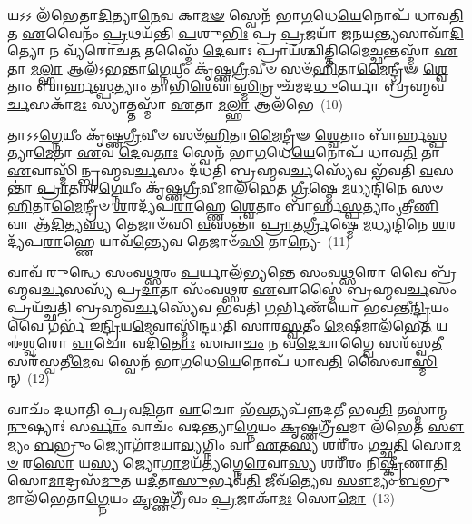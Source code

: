 𑌯𑌽𑌽 𑌲᳴𑌭𑍇𑌤𑌾\-\ul{𑌦𑌿}\-𑌤𑍍𑌯𑌾\-\ul{𑌨𑍇}\-𑌵 𑌕𑌾\-\ul{𑌮}\-\-\ul{𑍟} 𑌸𑍍𑌵𑍇𑌨᳴ 𑌭𑌾\-\ul{𑌗}\-𑌧𑍇\-\ul{𑌯𑍇}\-𑌨𑍋𑌪᳴ 𑌧𑌾𑌵\-\ul{𑌤𑌿} 𑌤 \ul{𑌏}\-𑌵𑍈𑌨𑌂᳴ \ul{𑌪𑍍𑌰}\-𑌥𑌯᳴𑌨𑍍𑌤𑌿 \ul{𑌪}\-𑌶𑍁\-\ul{𑌭𑌿𑌃} 𑌪𑍍𑌰 \ul{𑌪𑍍𑌰}\-𑌜𑌯𑌾᳴ 𑌜𑌨𑌯\-\ul{𑌨𑍍𑌤𑍍𑌯}\-𑌸𑌾𑌵𑌾᳴\-\ul{𑌦𑌿}\-𑌤𑍍𑌯𑍋 𑌨 𑌵𑍍𑌯᳴𑌰𑍋𑌚\-\ul{𑌤} 𑌤𑌸𑍍𑌮𑍈᳴ \ul{𑌦𑍇}\-𑌵𑌾𑌃 𑌪𑍍𑌰𑌾𑌯᳴𑌶𑍍𑌚𑌿𑌤𑍍𑌤𑌿𑌮𑍈\-\ul{𑌚𑍍𑌛}\-𑌨𑍍𑌤𑌸𑍍𑌮𑌾᳴ \ul{𑌏}\-𑌤𑌾 \ul{𑌮}\-\-\ul{𑌲𑍍}\-\mbox{}𑌹𑌾 𑌆𑌲᳴\-𑌽𑌭𑌨𑍍𑌤𑌾\-\ul{𑌗𑍍𑌨𑍇}\-𑌯𑍀𑌂 𑌕𑍃᳴𑌷𑍍𑌣\-\ul{𑌗𑍍𑌰𑍀}\-𑌵𑍀𑍞 𑌸𑍞᳴\-\ul{𑌹𑌿}\-𑌤𑌾\-\ul{𑌮𑍈}\-𑌨𑍍𑌦𑍍𑌰𑍀𑍟 \ul{𑌶𑍍𑌵𑍇}\-𑌤𑌾𑌂 𑌬𑌾᳴𑌰𑍍\mbox{}𑌹\-\ul{𑌸𑍍𑌪}\-𑌤𑍍𑌯𑌾𑌂 𑌤𑌾𑌭𑌿᳴\-\ul{𑌰𑍇}\-𑌵𑌾\-\ul{𑌸𑍍𑌮𑌿}\-𑌨𑍍𑌰𑍁𑌚᳴𑌮𑌦\-\ul{𑌧𑍁}\-𑌰𑍍𑌯𑍋 𑌬𑍍𑌰᳴𑌹𑍍𑌮𑌵\-\ul{𑌰𑍍𑌚}\-𑌸𑌕𑌾᳴\-\ul{𑌮𑌃} 𑌸𑍍𑌯𑌾𑌤𑍍𑌤𑌸𑍍𑌮𑌾᳴ \ul{𑌏}\-𑌤𑌾 \ul{𑌮}\-\-\ul{𑌲𑍍}\-\mbox{}𑌹𑌾 𑌆𑌲᳴𑌭𑍇\-~(10)

𑌤𑌾𑌽𑌽\-\ul{𑌗𑍍𑌨𑍇}\-𑌯𑍀𑌂 𑌕𑍃᳴𑌷𑍍𑌣\-\ul{𑌗𑍍𑌰𑍀}\-𑌵𑍀𑍞 𑌸𑍞᳴\-\ul{𑌹𑌿}\-𑌤𑌾\-\ul{𑌮𑍈}\-𑌨𑍍𑌦𑍍𑌰𑍀𑍟 \ul{𑌶𑍍𑌵𑍇}\-𑌤𑌾𑌂 𑌬𑌾᳴𑌰𑍍\mbox{}𑌹\-\ul{𑌸𑍍𑌪}\-𑌤𑍍𑌯𑌾\-\ul{𑌮𑍇}\-𑌤𑌾 \ul{𑌏}\-𑌵 \ul{𑌦𑍇}\-𑌵\-\ul{𑌤𑌾𑌃} 𑌸𑍍𑌵𑍇𑌨᳴ 𑌭𑌾\-\ul{𑌗}\-𑌧𑍇\-\ul{𑌯𑍇}\-𑌨𑍋𑌪᳴ 𑌧𑌾𑌵\-\ul{𑌤𑌿} 𑌤𑌾 \ul{𑌏}\-𑌵𑌾𑌸𑍍𑌮𑌿᳴𑌨𑍍𑌬𑍍𑌰𑌹𑍍𑌮𑌵\-\ul{𑌰𑍍𑌚}\-𑌸𑌂 𑌦᳴𑌧𑌤𑌿 𑌬𑍍𑌰𑌹𑍍𑌮𑌵\-\ul{𑌰𑍍𑌚}\-𑌸𑍍𑌯𑍇᳴𑌵 𑌭᳴𑌵𑌤𑌿 \ul{𑌵}\-𑌸𑌨𑍍𑌤𑌾॑ \ul{𑌪𑍍𑌰𑌾}\-𑌤𑌰𑌾॑\-\ul{𑌗𑍍𑌨𑍇}\-𑌯𑍀𑌂 𑌕𑍃᳴𑌷𑍍𑌣\-\ul{𑌗𑍍𑌰𑍀}\-𑌵𑍀𑌮𑌾𑌲᳴𑌭𑍇𑌤 \ul{𑌗𑍍𑌰𑍀}\-𑌷𑍍𑌮𑍇 \ul{𑌮}\-𑌧𑍍𑌯𑌨𑍍𑌦𑌿᳴𑌨𑍇 𑌸𑍞\-\ul{𑌹𑌿}\-𑌤𑌾\-\ul{𑌮𑍈}\-𑌨𑍍𑌦𑍍𑌰𑍀𑍞 \ul{𑌶}\-𑌰𑌦𑍍𑌯᳴𑌪\-\ul{𑌰𑌾}\-𑌹𑍍𑌣𑍇 \ul{𑌶𑍍𑌵𑍇}\-𑌤𑌾𑌂 𑌬𑌾᳴𑌰𑍍\mbox{}𑌹\-\ul{𑌸𑍍𑌪}\-𑌤𑍍𑌯𑌾𑌂 𑌤𑍍𑌰𑍀\-\ul{𑌣𑌿} 𑌵𑌾 𑌆᳴\-\ul{𑌦𑌿}\-𑌤𑍍𑌯\-\ul{𑌸𑍍𑌯} 𑌤𑍇𑌜𑌾𑍞᳴𑌸𑌿 \ul{𑌵}\-𑌸𑌨𑍍𑌤𑌾॑ \ul{𑌪𑍍𑌰𑌾}\-𑌤\-\ul{𑌰𑍍𑌗𑍍𑌰𑍀}\-𑌷𑍍𑌮𑍇 \ul{𑌮}\-𑌧𑍍𑌯𑌨𑍍𑌦𑌿᳴𑌨𑍇 \ul{𑌶}\-𑌰𑌦𑍍𑌯᳴𑌪\-\ul{𑌰𑌾}\-𑌹𑍍𑌣𑍇 𑌯𑌾𑌵᳴\-\ul{𑌨𑍍𑌤𑍍𑌯𑍇}\-𑌵 𑌤𑍇𑌜𑌾𑍞᳴\-\ul{𑌸𑌿} 𑌤𑌾\-\ul{𑌨𑍍𑌯𑍇}\--~(11)

𑌵𑌾𑌵᳴ 𑌰𑍁𑌨𑍍𑌧𑍇 𑌸𑌂𑌵\-\ul{𑌥𑍍𑌸}\-𑌰𑌂 \ul{𑌪}\-𑌰𑍍𑌯𑌾𑌲᳴𑌭𑍍𑌯𑌨𑍍𑌤𑍇 𑌸𑌂𑌵\-\ul{𑌥𑍍𑌸}\-𑌰𑍋 𑌵𑍈 𑌬𑍍𑌰᳴𑌹𑍍𑌮𑌵\-\ul{𑌰𑍍𑌚}\-𑌸𑌸𑍍𑌯᳴ 𑌪𑍍𑌰\-\ul{𑌦𑌾}\-𑌤𑌾 𑌸𑌂᳴𑌵\-\ul{𑌥𑍍𑌸}\-𑌰 \ul{𑌏}\-𑌵𑌾𑌸𑍍𑌮𑍈॑ 𑌬𑍍𑌰𑌹𑍍𑌮𑌵\-\ul{𑌰𑍍𑌚}\-𑌸𑌂 𑌪𑍍𑌰𑌯᳴𑌚𑍍𑌛𑌤𑌿 𑌬𑍍𑌰𑌹𑍍𑌮𑌵\-\ul{𑌰𑍍𑌚}\-𑌸𑍍𑌯𑍇᳴𑌵 𑌭᳴𑌵𑌤𑌿 \ul{𑌗}\-𑌰𑍍𑌭𑌿𑌣᳴𑌯𑍋 𑌭𑌵𑌨𑍍𑌤𑍀\-\ul{𑌨𑍍𑌦𑍍𑌰𑌿}\-𑌯𑌂 𑌵𑍈 𑌗𑌰𑍍𑌭᳴ 𑌇\-\ul{𑌨𑍍𑌦𑍍𑌰𑌿}\-𑌯\-\ul{𑌮𑍇}\-𑌵𑌾𑌸𑍍𑌮𑌿᳴𑌨𑍍𑌦𑌧𑌤𑌿 𑌸𑌾𑌰\-\ul{𑌸𑍍𑌵}\-𑌤𑍀𑌂 \ul{𑌮𑍇}\-𑌷𑍀𑌮𑌾\-𑌲᳴𑌭𑍇\-\ul{𑌤} 𑌯 𑌈॑\-\ul{𑌶𑍍𑌵}\-𑌰𑍋 \ul{𑌵𑌾}\-𑌚𑍋 𑌵𑌦𑌿᳴\-\ul{𑌤𑍋𑌃} 𑌸𑌨𑍍𑌵𑌾\-\ul{𑌚𑌂} 𑌨 𑌵\-\ul{𑌦𑍇}\-𑌦𑍍𑌵𑌾𑌗𑍍𑌵𑍈 𑌸𑌰᳴𑌸𑍍𑌵\-\ul{𑌤𑍀} 𑌸𑌰᳴𑌸𑍍𑌵𑌤𑍀\-\ul{𑌮𑍇}\-𑌵 𑌸𑍍𑌵𑍇𑌨᳴ 𑌭𑌾\-\ul{𑌗}\-𑌧𑍇\-\ul{𑌯𑍇}\-𑌨𑍋𑌪᳴ 𑌧𑌾𑌵\-\ul{𑌤𑌿} 𑌸𑍈𑌵𑌾\-\ul{𑌸𑍍𑌮𑌿}\-𑌨𑍍~(12)

𑌵𑌾𑌚𑌂᳴ 𑌦𑌧𑌾𑌤𑌿 𑌪𑍍𑌰𑌵\-\ul{𑌦𑌿}\-𑌤𑌾 \ul{𑌵𑌾}\-𑌚𑍋 𑌭᳴\-\ul{𑌵}\-𑌤𑍍𑌯𑌪᳴𑌨𑍍𑌨𑌦𑌤𑍀 𑌭𑌵\-\ul{𑌤𑌿} 𑌤𑌸𑍍𑌮𑌾॑𑌨𑍍𑌮\-\ul{𑌨𑍁}\-𑌷𑍍𑌯𑌾𑌃॑ 𑌸\-\ul{𑌰𑍍𑌵𑌾𑌂} 𑌵𑌾𑌚𑌂᳴ 𑌵𑌦𑌨𑍍𑌤𑍍𑌯𑌾\-\ul{𑌗𑍍𑌨𑍇}\-𑌯𑌂 \ul{𑌕𑍃}\-𑌷𑍍𑌣𑌗𑍍𑌰𑍀᳴\-\ul{𑌵}\-𑌮𑌾 𑌲᳴𑌭𑍇𑌤 \ul{𑌸𑍗}\-𑌮𑍍𑌯𑌂 \ul{𑌬}\-𑌭𑍍𑌰𑍁𑌂 𑌜𑍍𑌯𑍋𑌗𑌾᳴𑌮𑌯𑌾\-\ul{𑌵𑍍𑌯}\-𑌗𑍍𑌨𑌿𑌂 𑌵𑌾 \ul{𑌏}\-𑌤\-\ul{𑌸𑍍𑌯} 𑌶𑌰𑍀᳴𑌰𑌂 𑌗𑌚𑍍𑌛\-\ul{𑌤𑌿} 𑌸𑍋\-\ul{𑌮}\-\-\ul{𑍞} 𑌰\-\ul{𑌸𑍋} 𑌯\-\ul{𑌸𑍍𑌯} 𑌜𑍍𑌯𑍋\-\ul{𑌗𑌾}\-𑌮𑌯᳴\-\ul{𑌤𑍍𑌯}\-𑌗𑍍𑌨𑍇\-\ul{𑌰𑍇}\-𑌵𑌾\-\ul{𑌸𑍍𑌯} 𑌶𑌰𑍀᳴𑌰𑌂 𑌨𑌿\-\ul{𑌷𑍍𑌕𑍍𑌰𑍀}\-𑌣𑌾\-\ul{𑌤𑌿} 𑌸𑍋\-\ul{𑌮𑌾}\-𑌦𑍍𑌰𑌸᳴\-\ul{𑌮𑍁}\-𑌤 𑌯\-\ul{𑌦𑍀}\-𑌤𑌾\-\ul{𑌸𑍁}\-𑌰𑍍𑌭𑌵᳴\-\ul{𑌤𑌿} 𑌜𑍀𑌵᳴\-\ul{𑌤𑍍𑌯𑍇}\-𑌵 \ul{𑌸𑍗}\-𑌮𑍍𑌯𑌂 \ul{𑌬}\-𑌭𑍍𑌰𑍁𑌮𑌾𑌲᳴𑌭𑍇𑌤𑌾\-\ul{𑌗𑍍𑌨𑍇}\-𑌯𑌂 \ul{𑌕𑍃}\-𑌷𑍍𑌣𑌗𑍍𑌰𑍀᳴𑌵𑌂 \ul{𑌪𑍍𑌰}\-𑌜𑌾𑌕𑌾᳴\-\ul{𑌮𑌃} 𑌸𑍋\-\ul{𑌮𑍋}\-~(13)

